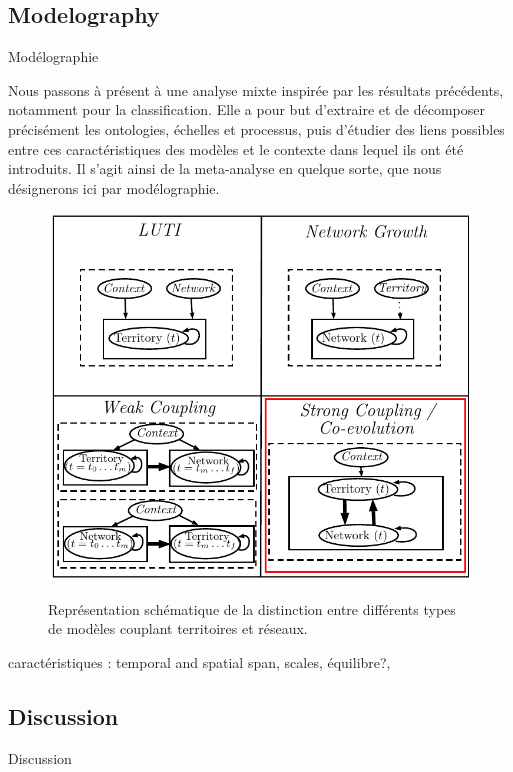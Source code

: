 \subsection{Modelography}{Modélographie}


Nous passons à présent à une analyse mixte inspirée par les résultats précédents, notamment pour la classification. Elle a pour but d'extraire et de décomposer précisément les ontologies, échelles et processus, puis d'étudier des liens possibles entre ces caractéristiques des modèles et le contexte dans lequel ils ont été introduits. Il s'agit ainsi de la meta-analyse en quelque sorte, que nous désignerons ici par modélographie.



\begin{figure}
\centering
\includegraphics[width=\textwidth]{Figures/Modelography/coevolution}
\caption{}{Représentation schématique de la distinction entre différents types de modèles couplant territoires et réseaux.}
\end{figure}




caractéristiques : temporal and spatial span, scales, équilibre?, 











\subsection{Discussion}{Discussion}













